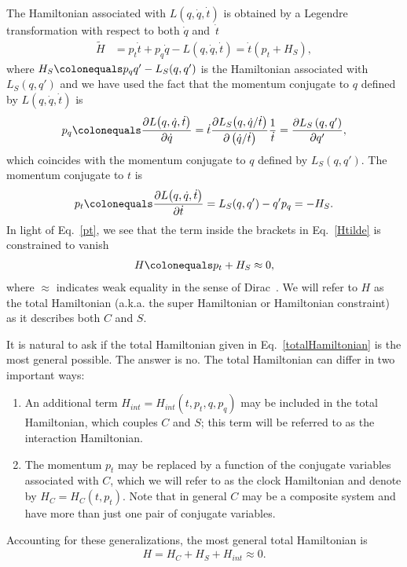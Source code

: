 \documentclass[a4paper,twocolumn,superscriptaddress,11pt,accepted=2019-06-04]{quantumarticle}
\newcommand{\ce}{\colonequals}
\newcommand{\nn}{\nonumber}		%
\begin{document}
The Hamiltonian associated with ${L}\left(q,\dot{q},\dot{t}\right)$ is obtained by a Legendre transformation with respect to both $\dot{q}$ and~$\dot{t}$
\begin{align}
\tilde{H} &= p_t \dot{t} + p_q \dot{q} - L(q,\dot{q},\dot{t}) = \dot{t} \left( p_t + H_S \right), \label{Htilde}
\end{align}
where $H_S \ce p_q q' - L_S \!\left(q,q'\right)$ is the Hamiltonian associated with $L_S \!\left(q,q'\right)$ and we have used the fact that the momentum conjugate to $q$ defined by ${L}\left(q,\dot{q},\dot{t}\right)$ is
\begin{align}
p_q \ce \frac{\partial L \!\left(q,\dot{q},\dot{t}\right)}{\partial \dot{q} } =  \dot{t} \frac{\partial L_S \!\left(q,\dot{q}/ \dot{t}\right)}{\partial \left(\dot{q} / \dot{t} \right) } \frac{1}{\dot{t}} =  \frac{\partial L_S\left(q, q'\right)}{\partial q' }, \nn
\end{align}
which coincides with the momentum conjugate to $q$ defined by $L_S\left(q,q'\right)$. The momentum conjugate to $t$ is
\begin{align}
p_t \ce \frac{\partial L\!\left(q,\dot{q},\dot{t}\right)}{\partial \dot{t} } =  L_S\!\left(q, q' \right)  - q' p_q =- H_S. \label{pt}
\end{align}
In light of Eq.~\eqref{pt}, we see that the term inside the brackets in Eq.~\eqref{Htilde} is constrained to vanish
\begin{align}
H \ce p_t + H_S \approx 0, \label{totalHamiltonian}
\end{align}
where $\approx$ indicates weak equality in the sense of Dirac~\cite{Dirac:1964}. We will refer to $H$ as the total Hamiltonian (a.k.a. the super Hamiltonian or Hamiltonian constraint) as it describes both $C$ and $S$.




It is natural to ask if the total Hamiltonian given in Eq.~\eqref{totalHamiltonian} is the most general possible. The answer is no. The total Hamiltonian can differ in two important ways:
\begin{enumerate}
\item An additional term $H_{int} = H_{int}(t, p_t, q,p_q)$ may be included in the total Hamiltonian, which couples $C$ and $S$; this term will be referred to as the interaction Hamiltonian.

\item The momentum $p_t$ may be replaced by a function of the conjugate variables associated with $C$, which we will refer to as the clock Hamiltonian and denote by $H_C = H_C(t, p_t)$. Note that in general  $C$ may be a composite system and have more than just one pair of conjugate variables.
\end{enumerate}
Accounting for these generalizations, the most general total Hamiltonian is
\begin{align}
H = H_C + H_S +  H_{int} \approx 0. \label{GeneralTotalHamiltonian}
\end{align}
\end{document}
